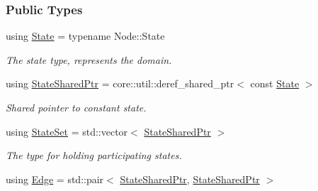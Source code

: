 \subsubsection*{Public Types}
\begin{DoxyCompactItemize}
\item 
using \hyperlink{structevent_1_1UniformChange_ab1e7d4054a2132fdb3b58295145f78cd}{State} = typename Node\+::\+State\hypertarget{structevent_1_1UniformChange_ab1e7d4054a2132fdb3b58295145f78cd}{}\label{structevent_1_1UniformChange_ab1e7d4054a2132fdb3b58295145f78cd}

\begin{DoxyCompactList}\small\item\em The state type, represents the domain. \end{DoxyCompactList}\item 
using \hyperlink{structevent_1_1UniformChange_a8f41f1a24c711875b55419d9f0eb6bd2}{State\+Shared\+Ptr} = core\+::util\+::deref\+\_\+shared\+\_\+ptr$<$ const \hyperlink{structevent_1_1UniformChange_ab1e7d4054a2132fdb3b58295145f78cd}{State} $>$\hypertarget{structevent_1_1UniformChange_a8f41f1a24c711875b55419d9f0eb6bd2}{}\label{structevent_1_1UniformChange_a8f41f1a24c711875b55419d9f0eb6bd2}

\begin{DoxyCompactList}\small\item\em Shared pointer to constant state. \end{DoxyCompactList}\item 
using \hyperlink{structevent_1_1UniformChange_a71997f4cc920d6c5c65fab2049d5e42d}{State\+Set} = std\+::vector$<$ \hyperlink{structevent_1_1UniformChange_a8f41f1a24c711875b55419d9f0eb6bd2}{State\+Shared\+Ptr} $>$\hypertarget{structevent_1_1UniformChange_a71997f4cc920d6c5c65fab2049d5e42d}{}\label{structevent_1_1UniformChange_a71997f4cc920d6c5c65fab2049d5e42d}

\begin{DoxyCompactList}\small\item\em The type for holding participating states. \end{DoxyCompactList}\item 
using \hyperlink{structevent_1_1UniformChange_a74eab4759202393dcf9438a25bd9261e}{Edge} = std\+::pair$<$ \hyperlink{structevent_1_1UniformChange_a8f41f1a24c711875b55419d9f0eb6bd2}{State\+Shared\+Ptr}, \hyperlink{structevent_1_1UniformChange_a8f41f1a24c711875b55419d9f0eb6bd2}{State\+Shared\+Ptr} $>$\hypertarget{structevent_1_1UniformChange_a74eab4759202393dcf9438a25bd9261e}{}\label{structevent_1_1UniformChange_a74eab4759202393dcf9438a25bd9261e}


\end{DoxyCompactItemize}
